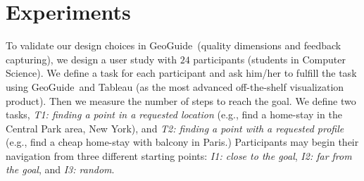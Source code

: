 \documentclass[conference,compsoc]{IEEEtran}
\newcommand{\framework}{{\sc GeoGuide}}
\begin{document}
%
%
%
%



\section{Experiments}
\label{sec:experiments}

\vspace{5pt}
To validate our design choices in \framework\ (quality dimensions and feedback capturing), we design a user study with $24$ participants (students in Computer Science). We define a task for each participant and ask him/her to fulfill the task using \framework\ and {\sc Tableau} (as the most advanced off-the-shelf visualization product). Then we measure the number of steps to reach the goal. We define two tasks, {\em T1: finding a point in a requested location} (e.g., find a home-stay in the Central Park area, New York), and {\em T2: finding a point with a requested profile} (e.g., find a cheap home-stay with balcony in Paris.) Participants may begin their navigation from three different starting points: {\em I1: close to the goal}, {\em I2: far from the goal}, and {\em I3: random}. 
\end{document}
